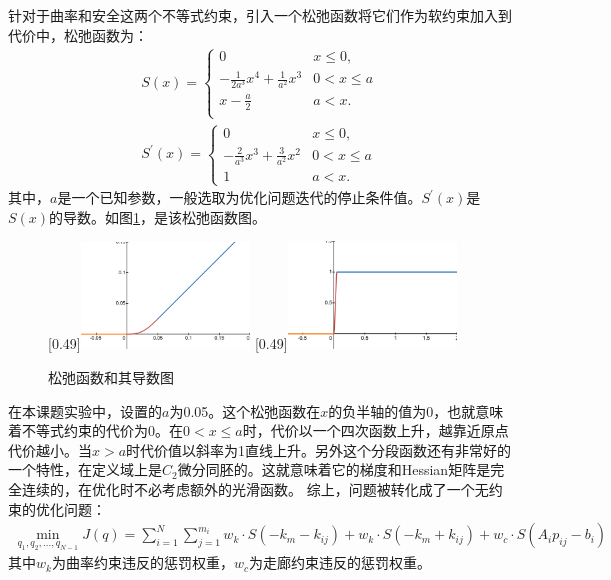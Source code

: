 \documentclass[master,academic]{ysuthesis} %
\begin{document}
		针对于曲率和安全这两个不等式约束，引入一个松弛函数将它们作为软约束加入到代价中，松弛函数为：
		\begin{equation}
			\begin{aligned}
				S( x ) =\left\{ \begin{matrix}
					0&		x\le 0,\\
					-\frac{1}{2a^3}x^4+\frac{1}{a^2}x^3&		0<x\le a\\
					x-\frac{a}{2}&		a<x.\\
				\end{matrix} \right.  \\
					S^{'}(x) = \left\{\begin{matrix}
					0& x\le0, \\
					-\frac{2}{a^3}x^3+\frac{3}{a^2}x^2& 0 < x \le a \\
					1& a < x.
				\end{matrix}\right.
			\end{aligned}
			\label{eq:松弛函数}
		\end{equation}
		其中，$a$是一个已知参数，一般选取为优化问题迭代的停止条件值。$S^{'}(x)$是$S(x)$的导数。如图\ref{fig:松弛函数图}，是该松弛函数图。
		\begin{figure}[!ht]
			\centering
			[0.49\textwidth]{\includegraphics[width=0.4\textwidth]{松弛函数.png}}
			[0.49\textwidth]{\includegraphics[width=0.4\textwidth]{松弛导数.png}}
			\caption{松弛函数和其导数图}
			\label{fig:松弛函数图}
		\end{figure}

		在本课题实验中，设置的$a$为0.05。这个松弛函数在$x$的负半轴的值为0，也就意味着不等式约束的代价为0。在$0<x \le a$时，代价以一个四次函数上升，越靠近原点代价越小。当$x>a$时代价值以斜率为1直线上升。另外这个分段函数还有非常好的一个特性，在定义域上是$C_2$微分同胚的。这就意味着它的梯度和Hessian矩阵是完全连续的，在优化时不必考虑额外的光滑函数。
		综上，问题被转化成了一个无约束的优化问题：
		\begin{equation}
			\begin{aligned}
				\min_{q_1,q_2,...,q_{N-1}}  J( q ) = \sum_{i=1}^N{\sum_{j=1}^{m_i}w_k\cdot{S( -k_m-k_{ij} ) +w_k\cdot S( -k_m+k_{ij} ) +w_c\cdot S( A_ip_{ij}-b_i )}}
			\end{aligned}
			\label{eq:单阶无约束优化代价}
		\end{equation}
		其中$w_k$为曲率约束违反的惩罚权重，$w_c$为走廊约束违反的惩罚权重。
\end{document}
